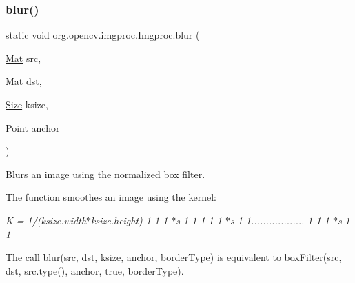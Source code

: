 \subsubsection{\texorpdfstring{blur()}{blur()}\hspace{0.1cm}{\footnotesize\ttfamily [2/3]}}
{\footnotesize\ttfamily static void org.\+opencv.\+imgproc.\+Imgproc.\+blur (\begin{DoxyParamCaption}\item[{\mbox{\hyperlink{classorg_1_1opencv_1_1core_1_1_mat}{Mat}}}]{src,  }\item[{\mbox{\hyperlink{classorg_1_1opencv_1_1core_1_1_mat}{Mat}}}]{dst,  }\item[{\mbox{\hyperlink{classorg_1_1opencv_1_1core_1_1_size}{Size}}}]{ksize,  }\item[{\mbox{\hyperlink{classorg_1_1opencv_1_1core_1_1_point}{Point}}}]{anchor }\end{DoxyParamCaption})\hspace{0.3cm}{\ttfamily [static]}}

Blurs an image using the normalized box filter.

The function smoothes an image using the kernel\+:

{\itshape K = 1/(ksize.\+width$\ast$ksize.height) 1 1 1 $\ast$s 1 1 1 1 1 $\ast$s 1 1.................. 1 1 1 $\ast$s 1 1 }

The call {\ttfamily blur(src, dst, ksize, anchor, border\+Type)} is equivalent to {\ttfamily box\+Filter(src, dst, src.\+type(), anchor, true, border\+Type)}.


